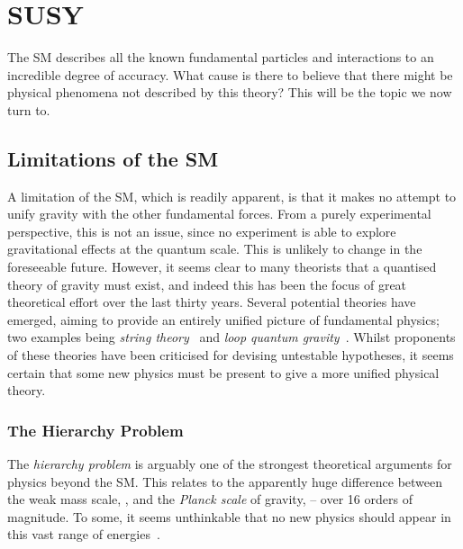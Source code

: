 \chapter{\acl{SUSY}}
\label{sec:susy}
The \ac{SM} describes all the known fundamental particles and interactions to an
incredible degree of accuracy. What cause is there to believe that there might
be physical phenomena not described by this theory? This will be the topic we
now turn to.

\section{Limitations of the \acl{SM}}
\label{sec:susy_limitations_sm}
A limitation of the \ac{SM}, which is readily apparent, is that it makes no
attempt to unify gravity with the other fundamental forces. From a purely
experimental perspective, this is not an issue, since no experiment is able to
explore gravitational effects at the quantum scale. This is unlikely to change
in the foreseeable future. However, it seems clear to many theorists that a
quantised theory of gravity must exist, and indeed this has been the focus of
great theoretical effort over the last thirty years. Several potential theories
have emerged, aiming to provide an entirely unified picture of fundamental
physics; two examples being \emph{string theory}~\cite{string_theory} and
\emph{loop quantum gravity}~\cite{loop_quantum}. Whilst proponents of these
theories have been criticised for devising untestable hypotheses, it seems
certain that some new physics must be present to give a more unified physical
theory.

\subsection{The Hierarchy Problem}
The \emph{hierarchy problem} is arguably one of the strongest theoretical
arguments for physics beyond the \ac{SM}. This relates to the apparently huge
difference between the weak mass scale, \Mweak, and the \emph{Planck scale} of
gravity, \Mplanck -- over 16 orders of magnitude. To some, it seems unthinkable
that no new physics should appear in this vast range of
energies~\cite{susy_primer}.

